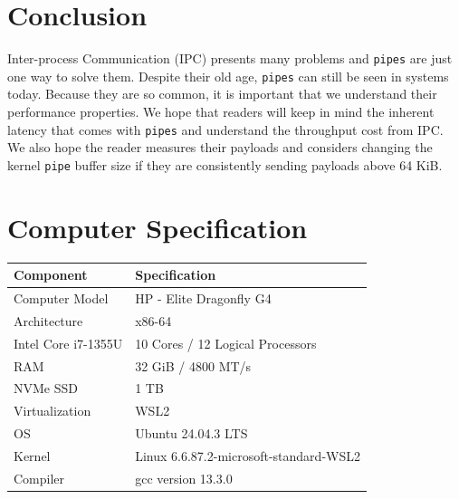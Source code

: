 \documentclass[11pt, twocolumn]{article}
\newcommand{\pipe}{\texttt{pipe}\xspace}
\newcommand{\pipes}{\texttt{pipes}\xspace}
\begin{document}
\section{Conclusion}
Inter-process Communication (IPC) presents many problems and \pipes are just one way to solve them.
Despite their old age, \pipes can still be seen in systems today. Because they are so common,
it is important that we understand their performance properties.
We hope that readers will keep in mind the inherent latency that comes with \pipes and understand
the throughput cost from IPC. 
We also hope the reader measures their payloads and considers changing the kernel \pipe buffer size
if they are consistently sending payloads above 64 KiB.  

\section*{Computer Specification}
\begin{table}[htbp]
\centering
\begin{tabular}{ll}
  \toprule
  Component & Specification \\
  \midrule
  Computer Model & HP - Elite Dragonfly G4 \\
  Architecture & x86-64 \\
  Intel Core i7-1355U & 10 Cores / 12 Logical Processors \\
  RAM & 32 GiB / 4800 MT/s \\
  NVMe SSD & 1 TB \\
  Virtualization & WSL2 \\
  OS & Ubuntu 24.04.3 LTS \\
  Kernel & Linux 6.6.87.2-microsoft-standard-WSL2 \\
  Compiler & gcc version 13.3.0 \\
  \bottomrule
\end{tabular}
\end{table}
\end{document}
